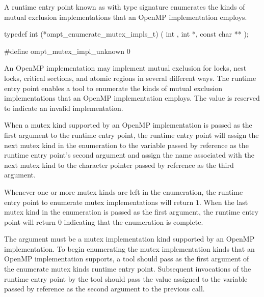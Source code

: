 \label{sec:ompt_enumerate_mutex_impls_t}
\label{sec:ompt_enumerate_mutex_impls}
\label{sec:ompt_mutex_impl_unknown}

\summary

A runtime entry point known as 
with type signature 
enumerates the kinds of mutual exclusion implementations that
an OpenMP implementation employs.


\format


\begin{ccppspecific}
\begin{omptInquiry}
typedef int (*ompt_enumerate_mutex_impls_t) (
  int ,
  int *,
  const char **
);

#define ompt_mutex_impl_unknown 0
\end{omptInquiry}
\end{ccppspecific}


\descr
An OpenMP implementation may implement mutual exclusion for locks,
nest locks, critical sections, and atomic regions in several different
ways.  The  runtime entry point
enables a tool to enumerate the
kinds of mutual exclusion implementations that an OpenMP implementation
employs.
The value  is reserved to indicate an invalid
implementation.



When a mutex kind supported by an OpenMP implementation is passed
as the first argument to the runtime entry point,
the runtime entry point will assign the next mutex kind in the enumeration to
the variable passed by reference as the runtime entry point's second argument
and assign the name associated with the next mutex kind
to the character pointer passed by reference as the third argument.

Whenever one or more mutex kinds are left in the enumeration,
the runtime entry point to enumerate mutex implementations will return $1$.
When the last mutex kind in the enumeration is passed
as the first argument, the runtime entry point will return $0$
indicating that the enumeration is complete.

\argdesc

The argument  must be a mutex implementation
kind supported by an OpenMP implementation.  To begin enumerating the
mutex implementation kinds that an OpenMP implementation supports, a
tool should pass  as the first
argument of the enumerate mutex kinds runtime entry point.  Subsequent
invocations of the runtime entry point by the tool should pass the
value assigned to the variable passed by reference as the second
argument to the previous call.

